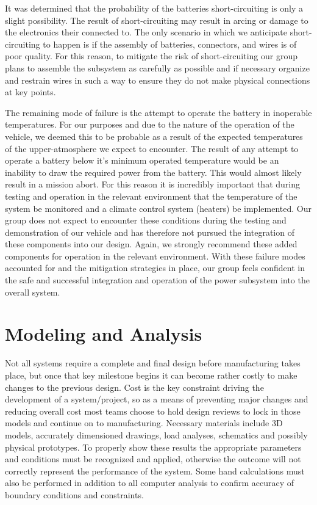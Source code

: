 It was determined that the probability of the batteries short-circuiting is only a slight possibility. The result of short-circuiting may result in arcing or damage to the electronics their connected to. The only scenario in which we anticipate short-circuiting to happen is if the assembly of batteries, connectors, and wires is of poor quality. For this reason, to mitigate the risk of short-circuiting our group plans to assemble the subsystem as carefully as possible and if necessary organize and restrain wires in such a way to ensure they do not make physical connections at key points. 

\indent\indent The remaining mode of failure is the attempt to operate the battery in inoperable temperatures. For our purposes and due to the nature of the operation of the vehicle, we deemed this to be probable as a result of the expected temperatures of the upper-atmosphere we expect to encounter. The result of any attempt to operate a battery below it's minimum operated temperature would be an inability to draw the required power from the battery. This would almost likely result in a mission abort. For this reason it is incredibly important that during testing and operation in the relevant environment that the temperature of the system be monitored and a climate control system (heaters) be implemented. Our group does not expect to encounter these conditions during the testing and demonstration of our vehicle and has therefore not pursued the integration of these components into our design. Again, we strongly recommend these added components for operation in the relevant environment. 
With these failure modes accounted for and the mitigation strategies in place, our group feels confident in the safe and successful integration and operation of the power subsystem into the overall system.


\section{Modeling and Analysis}

\indent\indent Not all systems require a complete and final design before manufacturing takes place, but once that key milestone begins it can become rather costly to make changes to the previous design. Cost is the key constraint driving the development of a system/project, so as a means of preventing major changes and reducing overall cost most teams choose to hold design reviews to lock in those models and continue on to manufacturing. Necessary materials include 3D models, accurately dimensioned drawings, load analyses, schematics and possibly physical prototypes. To properly show these results the appropriate parameters and conditions must be recognized and applied, otherwise the outcome will not correctly represent the performance of the system. Some hand calculations must also be performed in addition to all computer analysis to confirm accuracy of boundary conditions and constraints.

